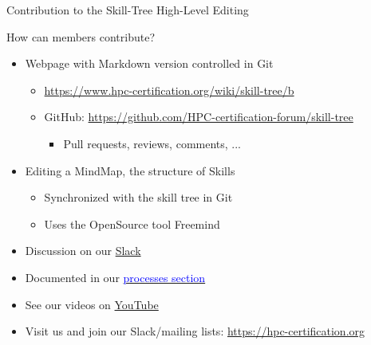 \documentclass[compress,aspectratio=169]{beamer}
\newcommand{\hrefb}[2]{\href{#1}{\textcolor{blue}{#2}}}
\begin{document}
\begin{frame}{Contribution to the Skill-Tree High-Level Editing}

  \begin{block}{How can members contribute?}
  \begin{itemize}
    \item Webpage with Markdown version controlled in Git
      \begin{itemize}
        \item \url{https://www.hpc-certification.org/wiki/skill-tree/b}
        \item GitHub: \url{https://github.com/HPC-certification-forum/skill-tree}
        \begin{itemize}
          \item Pull requests, reviews, comments, ...
        \end{itemize}
      \end{itemize}
    \item Editing a MindMap, the structure of Skills
      \begin{itemize}
        \item Synchronized with the skill tree in Git
        \item Uses the OpenSource tool Freemind
      \end{itemize}
    \item Discussion on our \href{https://join.slack.com/t/hpc-certification/shared_invite/enQtMzUwNzU3NzM2MTkzLTAzZWM3NDg0N2I2ZmQwOWI5ZGUwNjNlNDgzM2RmOTM3ZWRjNjIxYTc5NzUxYTJhNmRlNmM5YmE1NDY3YzkzYzA}{Slack}
    \item Documented in our \hrefb{https://www.hpc-certification.org/processes/}{processes section}
    \item See our videos on \href{https://www.youtube.com/playlist?list=PL4b682pSp7MQbdhhvwisrPo7PjYya26_g}{YouTube}
    \item Visit us and join our Slack/mailing lists: \url{https://hpc-certification.org}
  \end{itemize}
  \end{block}
\end{frame}



\end{document}
